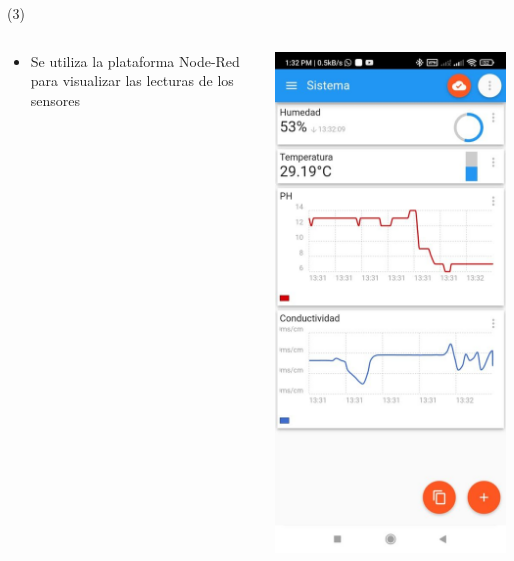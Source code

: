 \begin{frame}{ (3)}
\begin{columns}
\begin{column}{0.30\textwidth}
\begin{itemize}
		\item Se utiliza la plataforma Node-Red para visualizar las lecturas de los sensores
	\end{itemize}
\end{column}
\begin{column}{0.20\textwidth}  
         \includegraphics[width=0.98\textwidth]{2022_HidroponicosDavid/figs/app}


\end{column}
\end{columns}
\end{frame}

